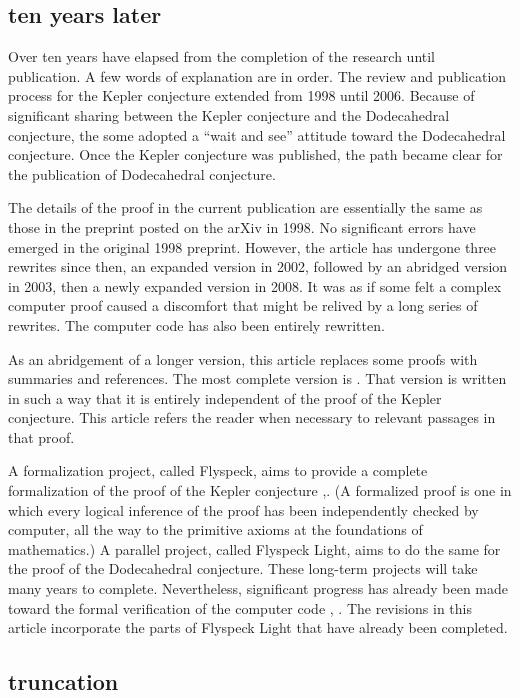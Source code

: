 \subsection{ten years later}

Over ten years have elapsed from the completion of the research until 
publication.  A few words of explanation are in order.
The review and 
publication process for the Kepler conjecture extended from 1998
until 2006.  Because of significant sharing between the Kepler conjecture
and the Dodecahedral conjecture, the some adopted a ``wait and see''
attitude toward the Dodecahedral conjecture.  Once the Kepler conjecture
was published, the path became clear for the publication of Dodecahedral
conjecture.  

The details of the proof in the current publication are essentially the
same as those in the preprint posted on the arXiv in 1998.  No
significant errors have emerged in the original 1998 preprint.   However,
the article has undergone three rewrites since then, an expanded version in 2002, followed by an abridged version in 2003, then a newly expanded version in 2008.  It was as if some felt a complex computer proof caused a discomfort that might be relived by a long series of
rewrites. The computer code has
also been entirely rewritten.

As an abridgement of a longer version, this article replaces 
some proofs with summaries and references.  The most complete version
is \cite{arx}.  That version is written in such a way that it is
entirely independent of the proof of the Kepler conjecture. 
This article refers the reader when necessary to relevant
passages in that proof.

A formalization project, called Flyspeck, aims to
provide a complete formalization of the proof of the Kepler conjecture \cite{fly},\cite{Fl}.  (A formalized proof is one in which every logical inference of the proof has been independently checked by computer, all the way to the primitive axioms at the foundations of mathematics.)
A parallel project, called Flyspeck Light, aims to do the same
for the proof of the Dodecahedral conjecture.  These long-term projects
will take many years to complete.  Nevertheless, significant progress
has already been made toward the formal verification of the computer
code \cite{BN}, \cite{Ob}.   The revisions in this article 
incorporate the parts of Flyspeck Light that have
already been completed.

\subsection{truncation}

